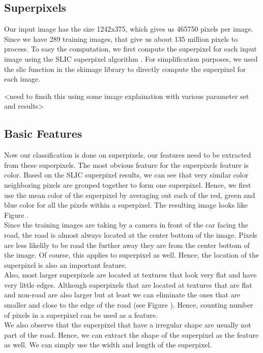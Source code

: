 \documentclass[paper=letter, fontsize=11pt]{scrartcl}
\numberwithin{equation}{section}		%
\numberwithin{figure}{section}			%
\numberwithin{table}{section}				%
\begin{document}
\subsection{Superpixels}
Our input image has the size 1242x375, which gives us 465750 pixels per image. Since we have 289 training images, that give us about 135 million pixels to process. To easy the computation, we first compute the superpixel for each input image using the SLIC superpixel algorithm \cite{bib:slic}. For simplification purposes, we used the slic function in the skimage library \cite{bib:skimage} to directly compute the superpixel for each image.

<need to finsih this using some image explaination with various parameter set and results>

\subsection{Basic Features}
Now our classification is done on superpixels, our features need to be extracted from these superpixels. The most obvious feature for the superpixels feature is color. Based on the SLIC superpixel results, we can see that very similar color neighboring pixels are grouped together to form one superpixel. Hence, we first use the mean color of the superpixel by averaging out each of the red, green and blue color for all the pixels within a superpixel. The resulting image looks like Figure \cite{fig:meanslic}. \\

Since the training images are taking by a camera in front of the car facing the road, the road is almost always located at the center bottom of the image. Pixels are less likelily to be road the further away they are from the center bottom of the image. Of course, this applies to superpixel as well. Hence, the location of the superpixel is also an important feature.\\ 

Also, most larger superpixels are located at textures that look very flat and have very little edges. Although superpixels that are located at textures that are flat and non-road are also larger but at least we can eliminate the ones that are smaller and close to the edge of the road (see Figure \cite{fig:smallsuperpixel}). Hence, counting number of pixels in a superpixel can be used as a feature.\\

We also observe that the superpixel that have a irregular shape  are usually not part of the road. Hence, we can extract the shape of the superpixel as the feature as well. We can simply use the width and length of the superpixel.\\
\end{document}
